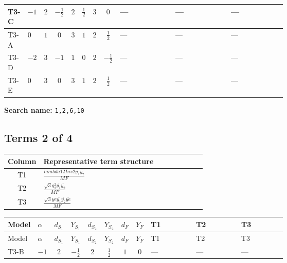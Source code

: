 \documentclass[8pt]{article}
\begin{document}
\begin{landscape}
\begin{longtable}{@{}llcccccc >{\raggedright\arraybackslash}p{0.21\linewidth} >{\raggedright\arraybackslash}p{0.21\linewidth} >{\raggedright\arraybackslash}p{0.21\linewidth}@{}}
\midrule
T3-C & $-1$ & $2$ & $-\frac{1}{2}$ & $2$ & $\frac{1}{2}$ & $3$ & $0$ & --- & --- & --- \\
\midrule
T3-A & $0$ & $1$ & $0$ & $3$ & $1$ & $2$ & $\frac{1}{2}$ & --- & --- & --- \\
\midrule
T3-D & $-2$ & $3$ & $-1$ & $1$ & $0$ & $2$ & $-\frac{1}{2}$ & --- & --- & --- \\
\midrule
T3-E & $0$ & $3$ & $0$ & $3$ & $1$ & $2$ & $\frac{1}{2}$ & --- & --- & --- \\
\midrule
\bottomrule
\end{longtable}
\clearpage
\noindent\textbf{Search name: }\texttt{1,2,6,10}\par\smallskip
\subsection*{Terms 2 of 4}
\begin{center}
\begin{tabular}{@{}c >{\raggedright\arraybackslash}p{0.82\linewidth}@{}}
\toprule
Column & Representative term structure \\
\midrule
T1 & \(\displaystyle \frac{lambda12Inv2 \overline{y_{1}} \overline{y_{2}}}{MF}\) \\
\midrule
T2 & \(\displaystyle \frac{\sqrt{3} g_{2}^{2} \overline{y_{1}} \overline{y_{2}}}{MF}\) \\
\midrule
T3 & \(\displaystyle \frac{\sqrt{3} ye \overline{y_{1}} \overline{y_{2}} \overline{ye}}{MF}\) \\
\midrule
\bottomrule
\end{tabular}
\end{center}
\smallskip
\tiny
\begin{longtable}{@{}llcccccc >{\raggedright\arraybackslash}p{0.21\linewidth} >{\raggedright\arraybackslash}p{0.21\linewidth} >{\raggedright\arraybackslash}p{0.21\linewidth}@{}}
\toprule
Model & $\alpha$ & $d_{S_1}$ & $Y_{S_1}$ & $d_{S_2}$ & $Y_{S_2}$ & $d_F$ & $Y_F$ & T1 & T2 & T3 \\
\midrule
\endfirsthead
\toprule
Model & $\alpha$ & $d_{S_1}$ & $Y_{S_1}$ & $d_{S_2}$ & $Y_{S_2}$ & $d_F$ & $Y_F$ & T1 & T2 & T3 \\
\midrule
\endhead
T3-B & $-1$ & $2$ & $-\frac{1}{2}$ & $2$ & $\frac{1}{2}$ & $1$ & $0$ & --- & --- & --- \\
\midrule

\end{longtable}
\end{landscape}
\end{document}
